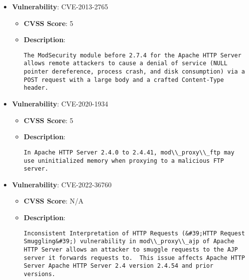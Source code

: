 \documentclass{article}
\begin{document}
\begin{itemize}
    
        \item \textbf{Vulnerability}: CVE-2013-2765
        \begin{itemize}
            \item \textbf{CVSS Score}:  5 
            \item \textbf{Description}:
            \parbox[t]{0.9\linewidth}{
                \verb|The ModSecurity module before 2.7.4 for the Apache HTTP Server allows remote attackers to cause a denial of service (NULL pointer dereference, process crash, and disk consumption) via a POST request with a large body and a crafted Content-Type header.|
            }
        \end{itemize}
    
        \item \textbf{Vulnerability}: CVE-2020-1934
        \begin{itemize}
            \item \textbf{CVSS Score}:  5 
            \item \textbf{Description}:
            \parbox[t]{0.9\linewidth}{
                \verb|In Apache HTTP Server 2.4.0 to 2.4.41, mod\\_proxy\\_ftp may use uninitialized memory when proxying to a malicious FTP server.|
            }
        \end{itemize}
    
        \item \textbf{Vulnerability}: CVE-2022-36760
        \begin{itemize}
            \item \textbf{CVSS Score}:  N/A 
            \item \textbf{Description}:
            \parbox[t]{0.9\linewidth}{
                \verb|Inconsistent Interpretation of HTTP Requests (&#39;HTTP Request Smuggling&#39;) vulnerability in mod\\_proxy\\_ajp of Apache HTTP Server allows an attacker to smuggle requests to the AJP server it forwards requests to.  This issue affects Apache HTTP Server Apache HTTP Server 2.4 version 2.4.54 and prior versions.|
            }
        \end{itemize}
    

\end{itemize}
\end{document}
